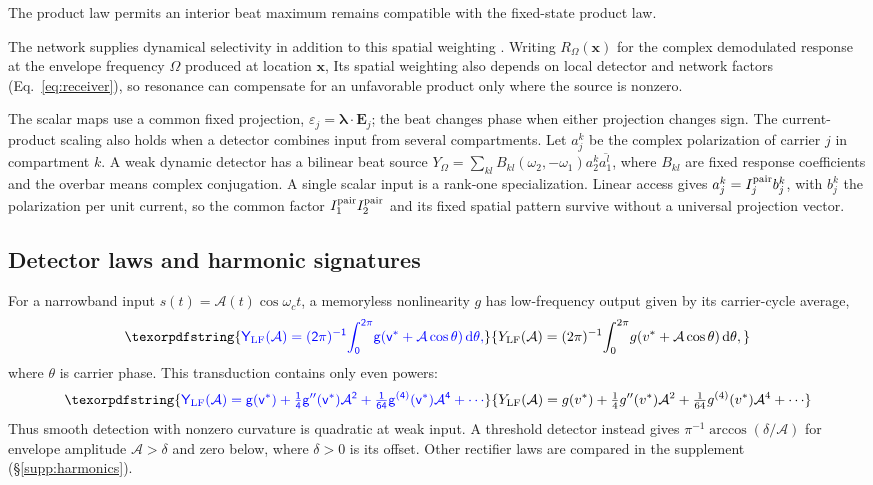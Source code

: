 \documentclass[11pt,a4paper]{article}
\providecommand{\DIFaddtex}[1]{{\protect\color{blue} \sf #1}} %
\providecommand{\DIFdeltex}[1]{{\protect\color{red} \scriptsize #1}} %
\providecommand{\DIFaddbegin}{} %
\providecommand{\DIFaddend}{} %
\providecommand{\DIFdelbegin}{} %
\providecommand{\DIFdelend}{} %
\providecommand{\DIFadd}[1]{\texorpdfstring{\DIFaddtex{#1}}{#1}} %
\providecommand{\DIFdel}[1]{\texorpdfstring{\DIFdeltex{#1}}{}} %
\begin{document}
\DIFadd{The product law permits an }\DIFaddend interior beat maximum\DIFdelbegin \DIFdel{remains
compatible with the fixed-state product law. }%

\DIFdel{The network supplies dynamical selectivity in addition to this spatial weighting }\DIFdelend . \DIFdelbegin \DIFdel{Writing
$R_\Omega(\mathbf{x})$ for the complex demodulated response at the envelope frequency $\Omega$
produced at location $\mathbf{x}$, }\DIFdelend \DIFaddbegin \DIFadd{Its spatial weighting also
depends on local detector and network factors (Eq.~\eqref{eq:receiver}), so
resonance can compensate for an unfavorable product only where the source
is nonzero.
}

\DIFadd{The scalar maps use a common fixed projection,
$\varepsilon_j=\boldsymbol\lambda\cdot\mathbf E_j$; the beat changes phase
when either projection changes sign. The current-product scaling also holds
when a detector combines input from several compartments. Let $a_j^k$ be the
complex polarization of carrier $j$ in compartment $k$. A weak dynamic
detector has a bilinear beat source
$Y_\Omega=\sum_{kl}B_{kl}(\omega_2,-\omega_1)a_2^k\overline{a_1^l}$,
where $B_{kl}$ are fixed response coefficients and the overbar means complex
conjugation. A single scalar input is a rank-one specialization. Linear
access gives $a_j^k=I_j^{\rm pair}b_j^k$, with $b_j^k$ the polarization per
unit current, so the common factor $I_1^{\rm pair}I_2^{\rm pair}$ and its
fixed spatial pattern survive without a universal projection vector.
}

\subsection{\DIFadd{Detector laws and harmonic signatures}}\label{sec:transduction}
\DIFadd{For a narrowband input $s(t)=\mathcal A(t)\cos\omega_c t$, a memoryless
nonlinearity $g$ has low-frequency output given by its carrier-cycle average,
}\[
\DIFadd{Y_{\rm LF}(\mathcal A)=(2\pi)^{-1}\!\int_0^{2\pi}\!g(v^*+\mathcal A\cos\theta)\,\mathrm{d}\theta,
}\]
\DIFadd{where $\theta$ is carrier phase. This transduction contains
only even powers:
}\begin{equation}
\DIFadd{Y_{\rm LF}(\mathcal A)=g(v^*)+\tfrac14 g''(v^*)\mathcal A^2+\tfrac1{64}g^{(4)}(v^*)\mathcal A^4+\cdots
\label{eq:cycavg}
}\end{equation}
\DIFadd{Thus smooth detection with nonzero curvature is quadratic at weak input.
A threshold detector instead gives
$\pi^{-1}\arccos(\delta/\mathcal A)$ for envelope amplitude
$\mathcal A>\delta$ and zero below, where $\delta>0$ is its offset.
Other rectifier laws are compared in the supplement (\S\ref{supp:harmonics}).
}
\end{document}
